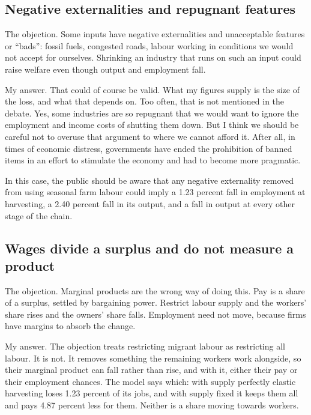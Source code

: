 \documentclass[11pt,a4paper]{article}
\begin{document}
\subsection{Negative externalities and repugnant features}

The objection. Some inputs have negative externalities and unacceptable features or ``bads'': fossil fuels, congested roads, labour working in conditions we would not accept for ourselves. Shrinking an industry that runs on such an input could raise welfare even though output and employment fall.

My answer. That could of course be valid. What my figures supply is the size of the loss, and what that depends on. Too often, that is not mentioned in the debate. Yes, some industries are so repugnant that we would want to ignore the employment and income costs of shutting them down. But I think we should be careful not to overuse that argument to where we cannot afford it. After all, in times of economic distress, governments have ended the prohibition of banned items in an effort to stimulate the economy and had to become more pragmatic.

In this case, the public should be aware that any negative externality removed from using seasonal farm labour could imply a 1.23 percent fall in employment at harvesting, a 2.40 percent fall in its output, and a fall in output at every other stage of the chain.

\subsection{Wages divide a surplus and do not measure a product}

The objection. Marginal products are the wrong way of doing this. Pay is a share of a surplus, settled by bargaining power. Restrict labour supply and the workers' share rises and the owners' share falls. Employment need not move, because firms have margins to absorb the change.

My answer. The objection treats restricting migrant labour as restricting all labour. It is not. It removes something the remaining workers work alongside, so their marginal product can fall rather than rise, and with it, either their pay or their employment chances. The model says which: with supply perfectly elastic harvesting loses 1.23 percent of its jobs, and with supply fixed it keeps them all and pays 4.87 percent less for them. Neither is a share moving towards workers.
\end{document}

